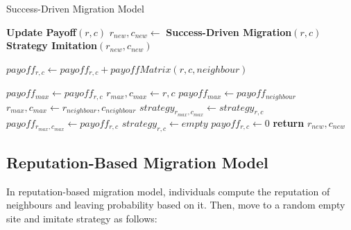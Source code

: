 \documentclass[11pt]{article}
\begin{document}
\begin{algorithm}[H]
  \caption{Success-Driven Migration Model}\label{successdriven}
	\begin{algorithmic}[1]
			
			\State \textbf{Update Payoff$(r,c)$}
			\State $r_{new},c_{new} \gets$ \textbf{Success-Driven Migration$(r,c)$}
			\State \textbf{Strategy Imitation$(r_{new},c_{new})$}
		\EndFor      
		\EndFor      
    \EndProcedure
	\end{algorithmic}
		
	\begin{algorithmic}[1]
      	\State $payoff_{r,c} \gets payoff_{r,c} + payoffMatrix(r,c, neighbour)$ 
      \EndFor      
    \EndProcedure
  \end{algorithmic}		
		
	\begin{algorithmic}[1]
      \State $payoff_{max} \gets payoff_{r,c}$
      \State $r_{max},c_{max} \gets r,c$
        \State $payoff_{max} \gets payoff_{neighbour}$
        \State $r_{max},c_{max} \gets r_{neighbour},c_{neighbour}$
        \EndIf
      \EndFor
      \State $strategy_{r_{max},c_{max}} \gets strategy_{r,c}$   
      \State $payoff_{r_{max},c_{max}} \gets payoff_{r,c}$
      \State $strategy_{r,c} \gets empty$   
      \State $payoff_{r,c} \gets 0$
      \State \textbf{return} $r_{new},c_{new}$	
    \EndProcedure
  \end{algorithmic}
\end{algorithm}


\subsection{Reputation-Based Migration Model}
In reputation-based migration model, individuals compute the reputation of neighbours and leaving probability based on it. Then, move to a random empty site and imitate strategy as follows:
\end{document}
